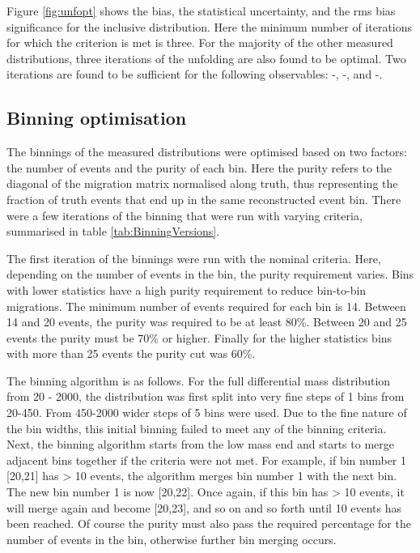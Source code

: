 Figure \ref{fig:unfopt} shows the bias, the statistical uncertainty, and the rms bias significance for the inclusive \mFourL distribution. Here the minimum number of iterations for which the criterion is met is three. For the majority of the other measured distributions, three iterations of the unfolding are also found to be optimal. Two iterations are found to be sufficient for the following observables: \mZOne-\mFourL, \dPhill-\mFourL, and \dYPairs-\mFourL.

\subsection{Binning optimisation}
\label{subsec:binningopt}

The binnings of the measured distributions were optimised based on two factors: the number of events and the purity of each bin. Here the purity refers to the diagonal of the migration matrix normalised along truth, thus representing the fraction of truth events that end up in the same reconstructed event bin. There were a few iterations of the binning that were run with varying criteria, summarised in table \ref{tab:BinningVersions}.

The first iteration of the binnings were run with the nominal criteria. Here, depending on the number of events in the bin, the purity requirement varies. Bins with lower statistics have a high purity requirement to reduce bin-to-bin migrations. The minimum number of events required for each bin is 14. Between 14 and 20 events, the purity was required to be at least 80\%. Between 20 and 25 events the purity must be 70\% or higher. Finally for the higher statistics bins with more than 25 events the purity cut was 60\%. 

The binning algorithm is as follows. For the full \mFourL differential mass distribution from \unit{20}{\Gev} - \unit{2000}{\GeV}, the distribution was first split into very fine steps of \unit{1}{\GeV} bins from \unit{20}{\Gev}-\unit{450}{\GeV}. From \unit{450}{\Gev}-\unit{2000}{\GeV} wider steps of \unit{5}{\GeV} bins were used. Due to the fine nature of the bin widths, this initial binning failed to meet any of the binning criteria. Next, the binning algorithm starts from the low mass end and starts to merge adjacent bins together if the criteria were not met. For example, if bin number 1 [20,21] has > 10 events, the algorithm merges bin number 1 with the next bin. The new bin number 1 is now [20,22]. Once again, if this bin has > 10 events, it will merge again and become [20,23], and so on and so forth until 10 events has been reached. Of course the purity must also pass the required percentage for the number of events in the bin, otherwise further bin merging occurs.  

